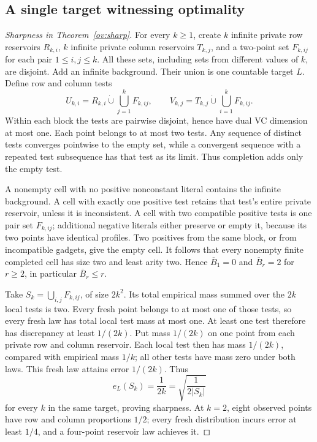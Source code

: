 \subsection{A single target witnessing optimality}
\begin{proof}[Sharpness in Theorem~\ref{ov:sharp}]
For every $k\ge1$, create $k$ infinite private row reservoirs $R_{k,i}$, $k$ infinite private column reservoirs $T_{k,j}$, and a two-point set $F_{k,ij}$ for each pair $1\le i,j\le k$. All these sets, including sets from different values of $k$, are disjoint. Add an infinite background. Their union is one countable target $L$. Define row and column tests
\[
 U_{k,i}=R_{k,i}\mathbin{\dot\cup}\bigcup_{j=1}^kF_{k,ij},
 \qquad
 V_{k,j}=T_{k,j}\mathbin{\dot\cup}\bigcup_{i=1}^kF_{k,ij}.
\]
Within each block the tests are pairwise disjoint, hence have dual VC dimension at most one. Each point belongs to at most two tests. Any sequence of distinct tests converges pointwise to the empty set, while a convergent sequence with a repeated test subsequence has that test as its limit. Thus completion adds only the empty test.

A nonempty cell with no positive nonconstant literal contains the infinite background. A cell with exactly one positive test retains that test's entire private reservoir, unless it is inconsistent. A cell with two compatible positive tests is one pair set $F_{k,ij}$; additional negative literals either preserve or empty it, because its two points have identical profiles. Two positives from the same block, or from incompatible gadgets, give the empty cell. It follows that every nonempty finite completed cell has size two and least arity two. Hence $\overline B_1=0$ and $\overline B_r=2$ for $r\ge2$, in particular $\overline B_r\le r$.

Take $S_k=\bigcup_{i,j}F_{k,ij}$, of size $2k^2$. Its total empirical mass summed over the $2k$ local tests is two. Every fresh point belongs to at most one of those tests, so every fresh law has total local test mass at most one. At least one test therefore has discrepancy at least $1/(2k)$. Put mass $1/(2k)$ on one point from each private row and column reservoir. Each local test then has mass $1/(2k)$, compared with empirical mass $1/k$; all other tests have mass zero under both laws. This fresh law attains error $1/(2k)$. Thus
\[
 e_L(S_k)=\frac1{2k}=\sqrt{\frac1{2|S_k|}}
\]
for every $k$ in the same target, proving sharpness. At $k=2$, eight observed points have row and column proportions $1/2$; every fresh distribution incurs error at least $1/4$, and a four-point reservoir law achieves it.
\end{proof}


